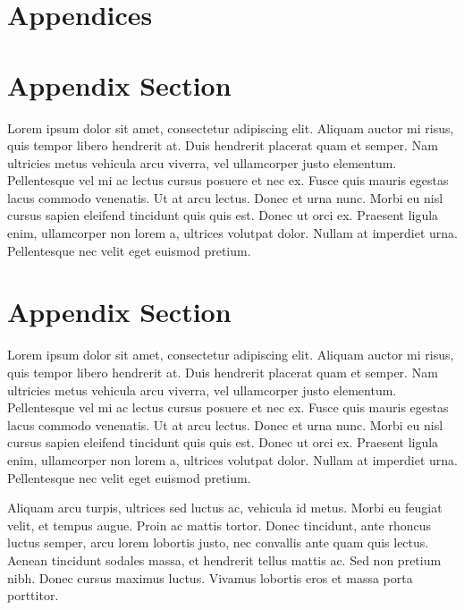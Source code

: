 \documentclass[a4paper]{CSMakotoTechnicalReport}
\begin{document}
\section*{Appendices}

\begin{appendices}

    \section{Appendix Section}

    Lorem ipsum dolor sit amet, consectetur adipiscing elit. Aliquam auctor mi risus, quis tempor libero hendrerit at. Duis hendrerit placerat quam et semper. Nam ultricies metus vehicula arcu viverra, vel ullamcorper justo elementum. Pellentesque vel mi ac lectus cursus posuere et nec ex. Fusce quis mauris egestas lacus commodo venenatis. Ut at arcu lectus. Donec et urna nunc. Morbi eu nisl cursus sapien eleifend tincidunt quis quis est. Donec ut orci ex. Praesent ligula enim, ullamcorper non lorem a, ultrices volutpat dolor. Nullam at imperdiet urna. Pellentesque nec velit eget euismod pretium.

    \section{Appendix Section}

    \begin{multicols}{2} %
        Lorem ipsum dolor sit amet, consectetur adipiscing elit. Aliquam auctor mi risus, quis tempor libero hendrerit at. Duis hendrerit placerat quam et semper. Nam ultricies metus vehicula arcu viverra, vel ullamcorper justo elementum. Pellentesque vel mi ac lectus cursus posuere et nec ex. Fusce quis mauris egestas lacus commodo venenatis. Ut at arcu lectus. Donec et urna nunc. Morbi eu nisl cursus sapien eleifend tincidunt quis quis est. Donec ut orci ex. Praesent ligula enim, ullamcorper non lorem a, ultrices volutpat dolor. Nullam at imperdiet urna. Pellentesque nec velit eget euismod pretium.

        Aliquam arcu turpis, ultrices sed luctus ac, vehicula id metus. Morbi eu feugiat velit, et tempus augue. Proin ac mattis tortor. Donec tincidunt, ante rhoncus luctus semper, arcu lorem lobortis justo, nec convallis ante quam quis lectus. Aenean tincidunt sodales massa, et hendrerit tellus mattis ac. Sed non pretium nibh. Donec cursus maximus luctus. Vivamus lobortis eros et massa porta porttitor.


\end{multicols}
\end{appendices}
\end{document}
